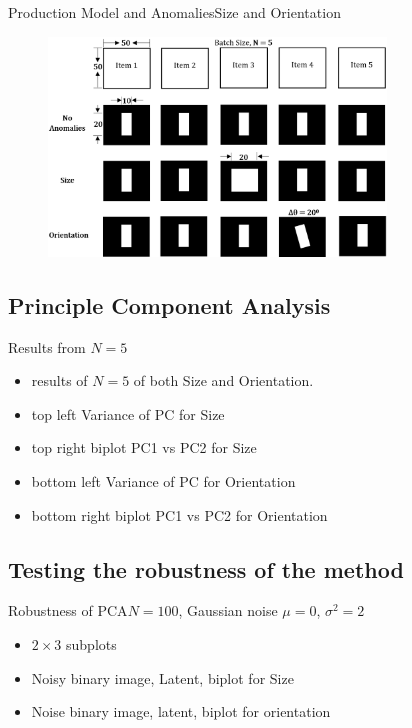 \documentclass{beamer}
\begin{document}
\begin{frame}{Production Model and Anomalies}{Size and Orientation}
  \begin{figure}
    \includegraphics[width=0.8\textwidth]{anomalies_model}
  \end{figure}
\end{frame}

\subsection{Principle Component Analysis}

\begin{frame}{Results from $N = 5$}
  \begin{itemize}
    \item results of $N = 5$ of both Size and Orientation.
    \item top left Variance of PC for Size
    \item top right biplot PC1 vs PC2 for Size
    \item bottom left Variance of PC for Orientation
    \item bottom right biplot PC1 vs PC2 for Orientation
  \end{itemize}
\end{frame}

\subsection{Testing the robustness of the method}

\begin{frame}{Robustness of PCA}{$N = 100$, Gaussian noise $\mu = 0$, $\sigma^2 = 2$}
  \begin{itemize}
    \item $2\times 3$ subplots
    \item Noisy binary image, Latent, biplot for Size
    \item Noise binary image, latent, biplot for orientation
  \end{itemize}
\end{frame}
\end{document}
